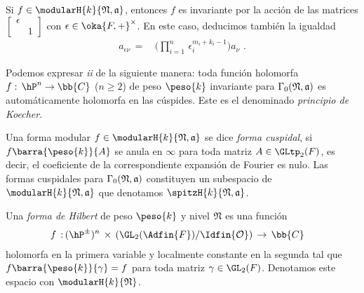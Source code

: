 Si $f\in\modularH{k}{\frak{N},\frak{a}}$, entonces $f$ es invariante
por la acci\'{o}n de las matrices
$\begin{bmatrix} \epsilon & \\ & 1 \end{bmatrix}$ con
$\epsilon\in\oka{F,+}^{\times}$. En este caso, deducimos tambi\'{e}n
la igualdad
\begin{align*}
	a_{\epsilon\nu} \,=\, & \bigg(\prod_{i=1}^{n}\,
	\epsilon_{i}^{m_{i}+k_{i}-1}\bigg)a_{\nu}
	\text{ .}
\end{align*}
%

\begin{obsPrincipioDeKoecher}
	Podemos expresar \textit{ii} de la siguiente manera: toda
	funci\'{o}n holomorfa $f:\,\hP^{n}\rightarrow\bb{C}$ ($n\geq 2$)
	de peso $\peso{k}$ invariante para $\Gamma_{0}(\frak{N},\frak{a})$
	es autom\'{a}ticamente holomorfa en las c\'{u}spides.
	Este es el denominado \emph{principio de Koecher}.
\end{obsPrincipioDeKoecher}

\begin{defHilbertCuspFormForGamma}
	Una forma modular $f\in\modularH{k}{\frak{N},\frak{a}}$
	se dice \emph{forma cuspidal}, si $f\barra{\peso{k}}{A}$ se anula
	en $\infty$ para toda matriz $A\in\GLtp_{2}(F)$, es decir,
	el coeficiente de la correspondiente expansi\'{o}n de Fourier
	es nulo. Las formas cuspidales para $\Gamma_{0}(\frak{N},\frak{a})$
	constituyen un subespacio de $\modularH{k}{\frak{N},\frak{a}}$
	que denotamos $\spitzH{k}{\frak{N},\frak{a}}$.
\end{defHilbertCuspFormForGamma}

\begin{defHilbertModularHilbertCuspForm}
	Una \emph{forma de Hilbert} de peso $\peso{k}$ y nivel $\frak{N}$
	es una funci\'{o}n
	\begin{align*}
		f\,:\, & (\hP^{\pm})^{n}\,\times\,
		(\GL_{2}(\Adfin{F})/\Idfin{\cal{O}})\,\rightarrow\,\bb{C}
	\end{align*}
	holomorfa en la primera variable y localmente constante en la
	segunda tal que $f\barra{\peso{k}}{\gamma}=f$ para toda matriz
	$\gamma\in\GL_{2}(F)$. Denotamos este espacio con
	$\modularH{k}{\frak{N}}$.
\end{defHilbertModularHilbertCuspForm}

